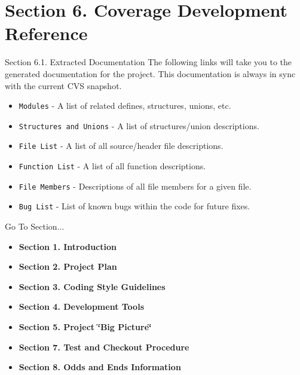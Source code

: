 \section{Section 6.  Coverage Development Reference}\label{page_code_details}
\begin{Desc}
\item[Section 6.1. Extracted Documentation]The following links will take you to the generated documentation for the project. This documentation is always in sync with the current CVS snapshot.\end{Desc}
\begin{Desc}
\item[]\begin{itemize}
\item {\tt Modules} - A list of related defines, structures, unions, etc.\item {\tt Structures and Unions} - A list of structures/union descriptions.\item {\tt File List} - A list of all source/header file descriptions.\item {\tt Function List} - A list of all function descriptions.\item {\tt File Members} - Descriptions of all file members for a given file.\item {\tt Bug List} - List of known bugs within the code for future fixes.\end{itemize}
\end{Desc}




\begin{Desc}
\item[Go To Section...]\begin{itemize}
\item {\bf Section 1.  Introduction} \item {\bf Section 2.  Project Plan} \item {\bf Section 3.  Coding Style Guidelines} \item {\bf Section 4.  Development Tools} \item {\bf Section 5.  Project \char`\"{}Big Picture\char`\"{}} \item {\bf Section 7.  Test and Checkout Procedure} \item {\bf Section 8.  Odds and Ends Information} \end{itemize}
\end{Desc}
